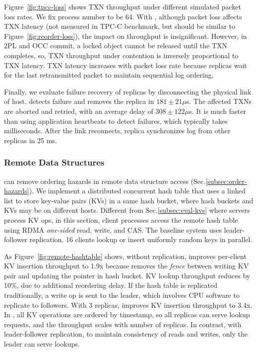 Figure~\ref{fig:tpcc-loss} shows TXN throughput under different simulated packet loss rates.
We fix process number to be 64.
With \sys{}, although packet loss affects TXN latency (not measured in TPC-C benchmark, but should be similar to Figure~\ref{fig:reorder-loss}), the impact on throughput is insignificant. %
However, in 2PL and OCC commit, a locked object cannot be released until the TXN completes, so, TXN throughput under contention is inversely proportional to TXN latency.
TXN latency increases with packet loss rate because replicas wait for the last retransmitted packet to maintain sequential log ordering.

Finally, we evaluate failure recovery of replicas by disconnecting the physical link of host. \sys{} detects failure and removes the replica in $181 \pm 21 \mu$s. The affected TXNs are aborted and retried, with an average delay of $308 \pm 122 \mu$s. It is much faster than using application heartbeats to detect failures, which typically takes milliseconds. After the link reconnects, replica synchronizes log from other replicas in 25 ms.

\subsubsection{Remote Data Structures}
\label{subsec:data-structure}

\sys{} can remove ordering hazards in remote data structure access (Sec.\ref{subsec:order-hazards}).
We implement a distributed concurrent hash table that uses a linked list to store key-value pairs (KVs) in a same hash bucket, where hash buckets and KVs may be on different hosts.
Different from Sec.\ref{subsec:eval-kvs} where servers process KV ops, in this section, client processes access the remote hash table using RDMA \emph{one-sided} read, write, and CAS.
The baseline system uses leader-follower replication.
16 clients lookup or insert uniformly random keys in parallel.

As Figure~\ref{fig:remote-hashtable} shows, without replication, \sys{} improves per-client KV insertion throughput to 1.9x because \sys{} removes the \emph{fence} between writing KV pair and updating the pointer in hash bucket.
KV lookup throughput reduces by 10\%, due to additional reordering delay.
If the hash table is replicated traditionally, a write op is sent to the leader, which involves CPU software to replicate to followers.
With 3 replicas, \sys{} improves KV insertion throughput to 3.4x.
In \sys{}, all KV operations are ordered by timestamp, so all replicas can serve lookup requests, and the throughput scales with number of replicas.
In contrast, with leader-follower replication, to maintain consistency of reads and writes, only the leader can serve lookups.


